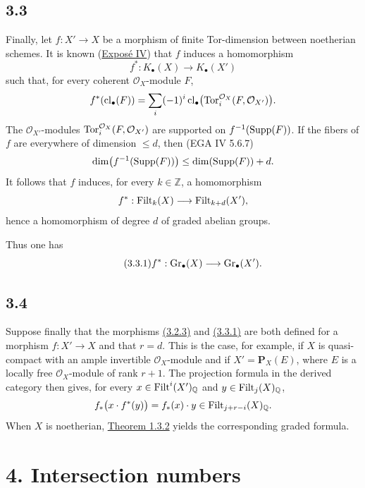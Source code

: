\subsection*{3.3}
Finally, let $f:X'\to X$ be a morphism of finite Tor-dimension between
noetherian schemes. It is known (\hyperlink{sga6.e04.expose}{Expos\'e IV}) that $f$ induces a homomorphism
\[
f^*:K_\bullet(X)\longrightarrow K_\bullet(X')
\]
such that, for every coherent $\mathcal O_X$-module $F$,
\[
f^*(\operatorname{cl}_\bullet(F))=
\sum_i(-1)^i\operatorname{cl}_\bullet\bigl(
\operatorname{Tor}_i^{\mathcal O_X}(F,\mathcal O_{X'})\bigr).
\]
The $\mathcal O_{X'}$-modules
$\operatorname{Tor}_i^{\mathcal O_X}(F,\mathcal O_{X'})$ are supported on
$f^{-1}(\operatorname{Supp}(F))$. If the fibers of $f$ are everywhere of dimension
$\leq d$, then (EGA IV 5.6.7)
\[
\dim\bigl(f^{-1}(\operatorname{Supp}(F))\bigr)\leq\dim(\operatorname{Supp}(F))+d.
\]
It follows that $f$ induces, for every $k\in\mathbb Z$, a homomorphism
\[
f^*:\operatorname{Filt}_k(X)\longrightarrow\operatorname{Filt}_{k+d}(X'),
\]
hence a homomorphism of degree $d$ of graded abelian groups.

Thus one has
\begin{equation}\tag{3.3.1}
f^*:\operatorname{Gr}_{\bullet}(X)\longrightarrow\operatorname{Gr}_{\bullet}(X').
\end{equation}

\subsection*{3.4}
Suppose finally that the morphisms \hyperlink{sga6.e10.eq.3-2-3}{(3.2.3)} and \hyperlink{sga6.e10.eq.3-3-1}{(3.3.1)} are both defined for a
morphism $f:X'\to X$ and that $r=d$. This is the case, for example, if $X$
is quasi-compact with an ample invertible $\mathcal O_X$-module and if
$X'=\mathbf P_X(E)$, where $E$ is a locally free $\mathcal O_X$-module of
rank $r+1$. The projection formula in the derived category then gives, for
every $x\in\operatorname{Filt}^i(X')_{\mathbb Q}$ and $y\in\operatorname{Filt}_j(X)_{\mathbb Q}$,
\[
f_*\bigl(x\cdot f^*(y)\bigr)=f_*(x)\cdot y
\in\operatorname{Filt}_{j+r-i}(X)_{\mathbb Q}.
\]
When $X$ is noetherian, \hyperlink{sga6.e10.thm.1-3-2}{Theorem 1.3.2} yields the corresponding graded formula.

\section*{4. Intersection numbers}

